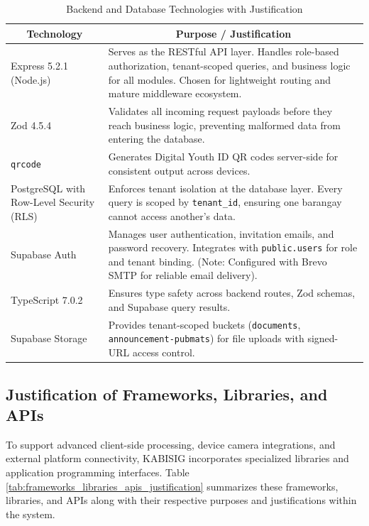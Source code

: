 \begin{table}[H]
\centering
\caption{Backend and Database Technologies with Justification}
\label{tab:backend_stack_justification}
\begin{tabular}{|l|p{8.5cm}|}
\hline
\multicolumn{1}{|c|}{\textbf{Technology}} & \multicolumn{1}{c|}{\textbf{Purpose / Justification}} \\ \hline
Express 5.2.1 (Node.js) & Serves as the RESTful API layer. Handles role-based authorization, tenant-scoped queries, and business logic for all modules. Chosen for lightweight routing and mature middleware ecosystem. \\ \hline
Zod 4.5.4 & Validates all incoming request payloads before they reach business logic, preventing malformed data from entering the database. \\ \hline
\texttt{qrcode} & Generates Digital Youth ID QR codes server-side for consistent output across devices. \\ \hline
PostgreSQL with Row-Level Security (RLS) & Enforces tenant isolation at the database layer. Every query is scoped by \texttt{tenant\_id}, ensuring one barangay cannot access another's data. \\ \hline
Supabase Auth & Manages user authentication, invitation emails, and password recovery. Integrates with \texttt{public.users} for role and tenant binding. (Note: Configured with Brevo SMTP for reliable email delivery). \\ \hline
TypeScript 7.0.2 & Ensures type safety across backend routes, Zod schemas, and Supabase query results. \\ \hline
Supabase Storage & Provides tenant-scoped buckets (\texttt{documents}, \texttt{announcement-pubmats}) for file uploads with signed-URL access control. \\ \hline
\end{tabular}
\end{table}
\vspace{5mm}

\subsection{Justification of Frameworks, Libraries, and APIs}
\label{subsec:justification_of_frameworks_libraries_and_apis}

\hspace*{\parindent}To support advanced client-side processing, device camera integrations, and external platform connectivity, KABISIG incorporates specialized libraries and application programming interfaces. Table \ref{tab:frameworks_libraries_apis_justification} summarizes these frameworks, libraries, and APIs along with their respective purposes and justifications within the system.

